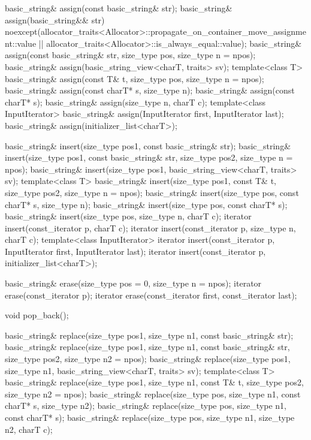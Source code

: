 \begin{codeblock}
{{    basic_string& assign(const basic_string& str);
    basic_string& assign(basic_string&& str)
      noexcept(allocator_traits<Allocator>::propagate_on_container_move_assignment::value ||
               allocator_traits<Allocator>::is_always_equal::value);
    basic_string& assign(const basic_string& str, size_type pos,
                         size_type n = npos);
    basic_string& assign(basic_string_view<charT, traits> sv);
    template<class T>
      basic_string& assign(const T& t, size_type pos, size_type n = npos);
    basic_string& assign(const charT* s, size_type n);
    basic_string& assign(const charT* s);
    basic_string& assign(size_type n, charT c);
    template<class InputIterator>
      basic_string& assign(InputIterator first, InputIterator last);
    basic_string& assign(initializer_list<charT>);

    basic_string& insert(size_type pos1, const basic_string& str);
    basic_string& insert(size_type pos1, const basic_string& str,
                         size_type pos2, size_type n = npos);
    basic_string& insert(size_type pos1, basic_string_view<charT, traits> sv);
    template<class T>
      basic_string& insert(size_type pos1, const T& t,
                           size_type pos2, size_type n = npos);
    basic_string& insert(size_type pos, const charT* s, size_type n);
    basic_string& insert(size_type pos, const charT* s);
    basic_string& insert(size_type pos, size_type n, charT c);
    iterator insert(const_iterator p, charT c);
    iterator insert(const_iterator p, size_type n, charT c);
    template<class InputIterator>
      iterator insert(const_iterator p, InputIterator first, InputIterator last);
    iterator insert(const_iterator p, initializer_list<charT>);

    basic_string& erase(size_type pos = 0, size_type n = npos);
    iterator erase(const_iterator p);
    iterator erase(const_iterator first, const_iterator last);

    void pop_back();

    basic_string& replace(size_type pos1, size_type n1,
                          const basic_string& str);
    basic_string& replace(size_type pos1, size_type n1,
                          const basic_string& str,
                          size_type pos2, size_type n2 = npos);
    basic_string& replace(size_type pos1, size_type n1,
                          basic_string_view<charT, traits> sv);
    template<class T>
      basic_string& replace(size_type pos1, size_type n1, const T& t,
                            size_type pos2, size_type n2 = npos);
    basic_string& replace(size_type pos, size_type n1, const charT* s,
                          size_type n2);
    basic_string& replace(size_type pos, size_type n1, const charT* s);
    basic_string& replace(size_type pos, size_type n1, size_type n2,
                          charT c);

}}
\end{codeblock}
